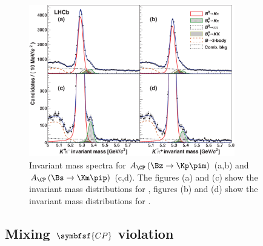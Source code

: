 \begin{figure}[tbp]
	\centering
	\includegraphics[width=0.8\textwidth]{03CPV/figs/DirectCPV}
	\caption{Invariant mass spectra for $A_{\CP}\left(\Bz\to\Kp\pim\right)$ (a,b) and $A_{\CP}\left(\Bs\to\Km\pip\right)$ (c,d). The figures (a) and (c) show the invariant mass distributions for \Kp\pim, figures (b) and (d) show the invariant mass distributions for \Km\pip.}
	\label{fig:DirectCPV}
\end{figure}


\subsection[head={Mixing \CP violation},tocentry={Mixing \CP violation}]{Mixing $\symbfsf{C{}P}$ violation}
\label{sec:MixingCPV}

